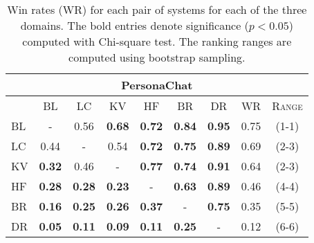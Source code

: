 \begin{table}[h!]
{\begin{tabular}{l|cccccc|cc}
\multicolumn{9}{c}{PersonaChat} \\
\toprule
\textsc{} & \textsc{BL}& \textsc{LC} &  \textsc{KV} &  \textsc{HF} & \textsc{BR}  & \textsc{DR} &\textsc{WR} & \textsc{Range}\\
\hline 
\textsc{BL}& - & 0.56 & \textbf{0.68} & \textbf{0.72} & \textbf{0.84} & \textbf{0.95}&  0.75 & (1-1) \\
\textsc{LC}& 0.44 & - & 0.54 & \textbf{0.72} & \textbf{0.75} & \textbf{0.89} & 0.69  & (2-3)\\
\textsc{KV}& \textbf{0.32} & 0.46 & - & \textbf{0.77} & \textbf{0.74} & \textbf{0.91} & 0.64 & (2-3)\\
\textsc{HF}& \textbf{0.28} & \textbf{0.28} & \textbf{0.23} & - & \textbf{0.63}& \textbf{0.89} & 0.46& (4-4)\\
\textsc{BR}& \textbf{0.16} & \textbf{0.25} & \textbf{0.26} & \textbf{0.37} & - & \textbf{0.75} & 0.35& (5-5) \\
\textsc{DR}& \textbf{0.05} & \textbf{0.11} & \textbf{0.09} & \textbf{0.11}& \textbf{0.25} & - & 0.12& (6-6) \\
\bottomrule
\end{tabular}
}
\caption{Win rates (WR) for each pair of systems for each of the three domains. The bold entries denote significance ($p < 0.05$) computed with Chi-square test. The ranking ranges are computed using bootstrap sampling. %
}
\label{tab:win_rates}
\end{table}